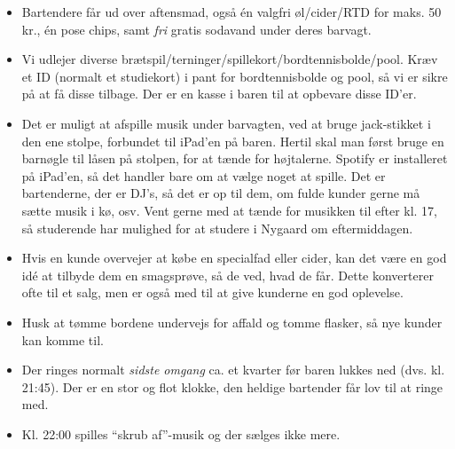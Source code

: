 \begin{itemize}
    \item Bartendere får ud over aftensmad, også én valgfri øl/cider/RTD for maks. 50 kr.,
    én pose chips, samt \textit{fri} gratis sodavand under deres barvagt.

    \item Vi udlejer diverse brætspil/terninger/spillekort/bordtennisbolde/pool. 
    Kræv et ID (normalt et studiekort) i pant for bordtennisbolde og pool, 
    så vi er sikre på at få disse tilbage. 
    Der er en kasse i baren til at opbevare disse ID'er.

    \item Det er muligt at afspille musik under barvagten, ved at bruge
    jack-stikket i den ene stolpe, forbundet til iPad'en på baren.
    Hertil skal man først bruge en barnøgle
    til låsen på stolpen, for at tænde for højtalerne.
    Spotify er installeret på iPad'en, så det handler bare om at vælge noget at spille.
    Det er bartenderne, der er DJ's, så det er op til dem,
    om fulde kunder gerne må sætte musik i kø, osv.
    Vent gerne med at tænde for musikken til efter kl. 17, så studerende har mulighed
    for at studere i Nygaard om eftermiddagen.

    \item Hvis en kunde overvejer at købe en specialfad eller cider, kan det være en god idé 
    at tilbyde dem en smagsprøve, så de ved, hvad de får. Dette konverterer ofte til et
    salg, men er også med til at give kunderne en god oplevelse.

    \item Husk at tømme bordene undervejs for affald og tomme flasker, så nye
    kunder kan komme til.

    \item Der ringes normalt \textit{sidste omgang}
    ca. et kvarter før baren lukkes ned
    (dvs. kl. 21:45). Der er en stor og flot klokke, den heldige bartender
    får lov til at ringe med.

    \item Kl. 22:00 spilles ``skrub af''-musik og der sælges ikke mere.
\end{itemize}
